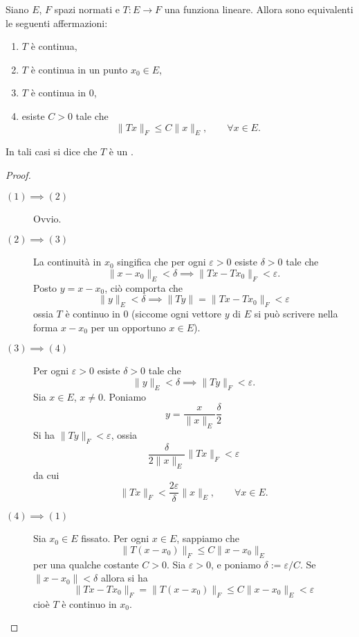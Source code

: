 \begin{theorem}
	Siano $E$, $F$ spazi normati e $T: E \to F$ una funziona lineare. Allora sono equivalenti le seguenti affermazioni:
	\begin{enumerate}
		\item $T$ è continua,
		\item $T$ è continua in un punto $x_0 \in E$,
		\item $T$ è continua in $0$,
		\item esiste $C > 0$ tale che
		$$
			\|Tx\|_F \leq C \|x\|_E, \qquad \forall x \in E.
		$$
	\end{enumerate}
	In tali casi si dice che $T$ è un .
\end{theorem}
\begin{proof}
	\leavevmode
	\begin{description}
		\item[$(1) \implies (2)$] Ovvio.
		\item[$(2) \implies (3)$] La continuità in $x_0$ singifica che per ogni $\varepsilon > 0$ esiste $\delta > 0$ tale che
		$$
			\|x-x_0\|_E < \delta \implies \|Tx - Tx_0\|_F < \varepsilon.
		$$
		Posto $y = x-x_0$, ciò comporta che
		$$
			\|y\|_E < \delta \implies \|Ty\| = \|Tx - Tx_0\|_F < \varepsilon
		$$
		ossia $T$ è continuo in $0$ (siccome ogni vettore $y$ di $E$ si può scrivere nella forma $x-x_0$ per un opportuno $x \in E$).
		\item[$(3) \implies (4)$] Per ogni $\varepsilon > 0$ esiste $\delta > 0$ tale che
		$$
			\|y\|_E < \delta \implies \|Ty\|_F < \varepsilon.
		$$
		Sia $x \in E$, $x \neq 0$. Poniamo
		$$
			y = \frac{x}{\|x\|_E}\frac{\delta}2
		$$
		Si ha $\|Ty\|_F < \varepsilon$, ossia
		$$
			\frac{\delta}{2\|x\|_E} \|Tx\|_F < \varepsilon
		$$
		da cui
		$$
			\|Tx\|_F < \frac{2\varepsilon}{\delta} \|x\|_E, \qquad \forall x \in E.
		$$
		\item[$(4) \implies (1)$] Sia $x_0 \in E$ fissato. Per ogni $x \in E$, sappiamo che
		$$
			\|T(x-x_0)\|_F \leq C \|x-x_0\|_E
		$$
		per una qualche costante $C > 0$. Sia $\varepsilon > 0$, e poniamo $\delta := \varepsilon/C$. Se $\|x-x_0\| < \delta$ allora si ha
		$$
			\|Tx - Tx_0\|_F = \|T(x-x_0)\|_F \leq C\|x-x_0\|_E < \varepsilon
		$$
		cioè $T$ è continuo in $x_0$.
	\end{description}
\end{proof}

